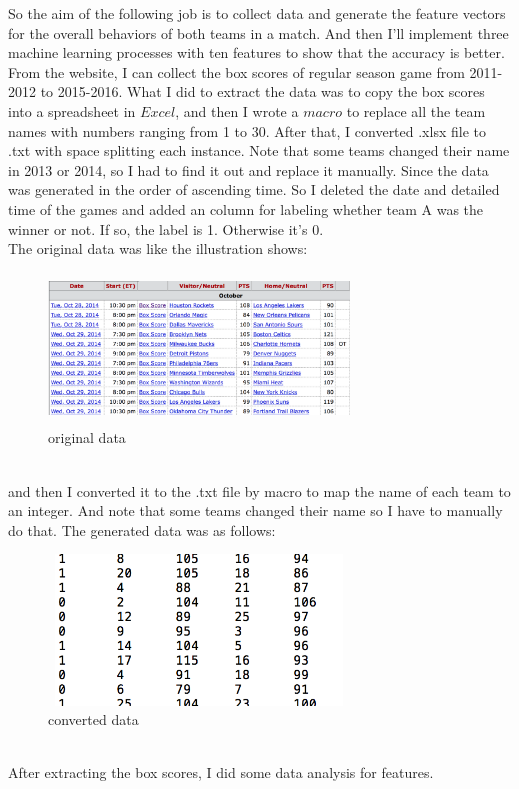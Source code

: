 \documentclass{article}
\begin{document}
So the aim of the following job is to collect data and generate the feature vectors for the overall behaviors of both teams in a match. And then I'll implement three machine learning processes with ten features to show that the accuracy is better.
 From the website, I can collect the box scores of regular season game from 2011-2012 to 2015-2016. What I did to extract the data was to copy the box scores into a spreadsheet in $Excel$, and then I wrote a $macro$ to replace all the team names with numbers ranging from 1 to 30. After that, I converted .xlsx file to .txt with space splitting each instance. Note that some teams changed their name in 2013 or 2014, so I had to find it out and replace it manually. Since the data was generated in the order of ascending time. So I deleted the date and detailed time of the games and added an column for labeling whether team A was the winner or not. If so, the label is 1. Otherwise it's 0. 
 \\
 The original data was like the illustration shows:
  \begin{figure}[htbp]
 \includegraphics[width=8cm, height=4cm]{datasource}
 \caption{original data}
 \end{figure}
 \\
 and then I converted it to the .txt file by macro to map the name of each team to an integer. And note that some teams changed their name so I have to manually do that. The generated data was as follows:
  \begin{figure}[htbp]
 \includegraphics[width=8cm, height=4cm]{converted}
 \caption{converted data}
 \end{figure}
 \\
 After extracting the box scores, I did some data analysis for features.
 
\end{document}
